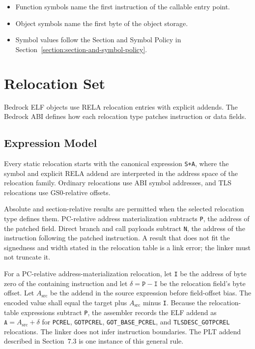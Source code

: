 \documentclass[10pt,twoside]{article}
\begin{document}
\begin{itemize}
\item Function symbols name the first instruction of the callable entry point.
\item Object symbols name the first byte of the object storage.
\item Symbol values follow the Section and Symbol Policy in
Section~\ref{section:section-and-symbol-policy}.
\end{itemize}
\clearpage
\section{Relocation Set}\label{page:relocation-set}
Bedrock ELF objects use RELA relocation entries with explicit addends. The Bedrock ABI defines how each relocation type patches instruction or data fields.
\subsection{Expression Model}
Every static relocation starts with the canonical expression \texttt{S+A},
where the symbol and explicit RELA addend are interpreted in the address space
of the relocation family. Ordinary relocations use ABI symbol addresses, and
TLS relocations use GS0-relative offsets.

Absolute and section-relative results are permitted when the selected
relocation type defines them. PC-relative address materialization subtracts
\texttt{P}, the address of the patched field. Direct branch and call payloads
subtract \texttt{N}, the address of the instruction following the patched
instruction. A result that does not fit the signedness and width stated in the
relocation table is a link error; the linker must not truncate it.

For a PC-relative address-materialization relocation, let \texttt{I} be the
address of byte zero of the containing instruction and let
$\delta=\texttt{P}-\texttt{I}$ be the relocation field's byte offset. Let
$A_{\mathrm{src}}$ be the addend in the source expression before field-offset
bias. The encoded value shall equal the target plus $A_{\mathrm{src}}$ minus
\texttt{I}. Because the relocation-table expressions subtract \texttt{P}, the
assembler records the ELF addend as $\texttt{A}=A_{\mathrm{src}}+\delta$ for
\texttt{PCREL}, \texttt{GOTPCREL}, \texttt{GOT\_BASE\_PCREL}, and
\texttt{TLSDESC\_GOTPCREL} relocations. The linker does not infer instruction
boundaries. The PLT addend described in Section~7.3 is one instance of this
general rule.
\end{document}
